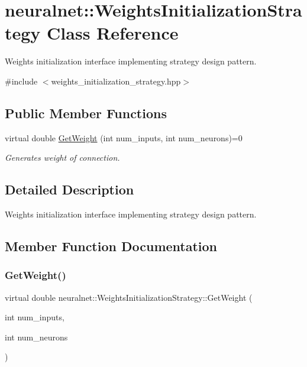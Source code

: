 \hypertarget{classneuralnet_1_1WeightsInitializationStrategy}{}\section{neuralnet\+:\+:Weights\+Initialization\+Strategy Class Reference}
\label{classneuralnet_1_1WeightsInitializationStrategy}


Weights initialization interface implementing strategy design pattern.  




{\ttfamily \#include $<$weights\+\_\+initialization\+\_\+strategy.\+hpp$>$}

\subsection*{Public Member Functions}
\begin{DoxyCompactItemize}
\item 
virtual double \hyperlink{classneuralnet_1_1WeightsInitializationStrategy_a9771c4acd74a10333899196d9f4ddec0}{Get\+Weight} (int num\+\_\+inputs, int num\+\_\+neurons)=0
\begin{DoxyCompactList}\small\item\em Generates weight of connection. \end{DoxyCompactList}\end{DoxyCompactItemize}


\subsection{Detailed Description}
Weights initialization interface implementing strategy design pattern. 

\subsection{Member Function Documentation}
\mbox{\label{classneuralnet_1_1WeightsInitializationStrategy_a9771c4acd74a10333899196d9f4ddec0}} 
\subsubsection{\texorpdfstring{Get\+Weight()}{GetWeight()}}
{\footnotesize\ttfamily virtual double neuralnet\+::\+Weights\+Initialization\+Strategy\+::\+Get\+Weight (\begin{DoxyParamCaption}\item[{int}]{num\+\_\+inputs,  }\item[{int}]{num\+\_\+neurons }\end{DoxyParamCaption})\hspace{0.3cm}{\ttfamily [pure virtual]}}



